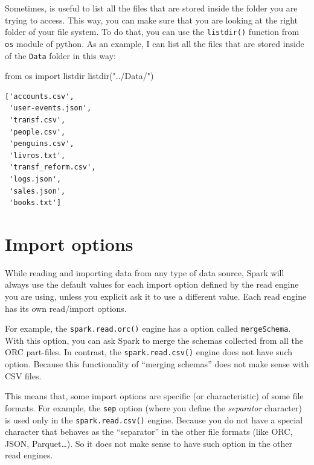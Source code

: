 \documentclass[
  11pt,
  letterpaper,
  DIV=11,
  numbers=noendperiod]{scrreprt}
\newenvironment{Shaded}{\begin{snugshade}}{\end{snugshade}}
\newcommand{\ImportTok}[1]{\textcolor[rgb]{0.00,0.46,0.62}{#1}}
\newcommand{\NormalTok}[1]{\textcolor[rgb]{0.00,0.23,0.31}{#1}}
\newcommand{\StringTok}[1]{\textcolor[rgb]{0.13,0.47,0.30}{#1}}
\begin{document}
Sometimes, is useful to list all the files that are stored inside the
folder you are trying to access. This way, you can make sure that you
are looking at the right folder of your file system. To do that, you can
use the \texttt{listdir()} function from \texttt{os} module of python.
As an example, I can list all the files that are stored inside of the
\texttt{Data} folder in this way:

\begin{Shaded}
\begin{Highlighting}[]
\ImportTok{from}\NormalTok{ os }\ImportTok{import}\NormalTok{ listdir}
\NormalTok{listdir(}\StringTok{"../Data/"}\NormalTok{)}
\end{Highlighting}
\end{Shaded}

\begin{verbatim}
['accounts.csv',
 'user-events.json',
 'transf.csv',
 'people.csv',
 'penguins.csv',
 'livros.txt',
 'transf_reform.csv',
 'logs.json',
 'sales.json',
 'books.txt']
\end{verbatim}

\hypertarget{import-options}{%
\section{Import options}\label{import-options}}

While reading and importing data from any type of data source, Spark
will always use the default values for each import option defined by the
read engine you are using, unless you explicit ask it to use a different
value. Each read engine has its own read/import options.

For example, the \texttt{spark.read.orc()} engine has a option called
\texttt{mergeSchema}. With this option, you can ask Spark to merge the
schemas collected from all the ORC part-files. In contrast, the
\texttt{spark.read.csv()} engine does not have such option. Because this
functionality of ``merging schemas'' does not make sense with CSV files.

This means that, some import options are specific (or characteristic) of
some file formats. For example, the \texttt{sep} option (where you
define the \emph{separator} character) is used only in the
\texttt{spark.read.csv()} engine. Because you do not have a special
character that behaves as the ``separator'' in the other file formats
(like ORC, JSON, Parquet\ldots). So it does not make sense to have such
option in the other read engines.
\end{document}
